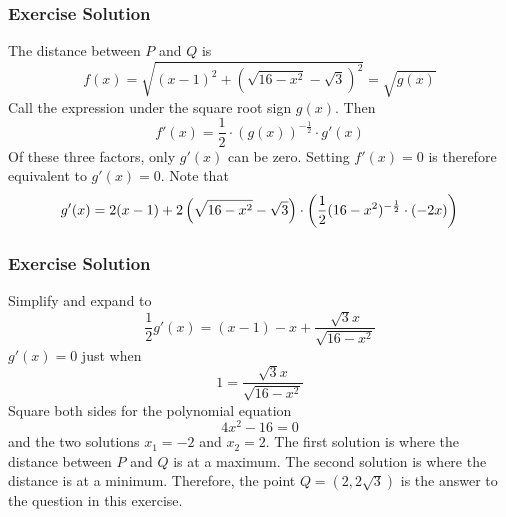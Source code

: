 \documentclass[xcolor=dvipsnames]{beamer}
\newcounter{exercise}
\begin{document}
\begin{frame}
  \frametitle{Exercise Solution}
  The distance between $P$ and $Q$ is
\begin{equation}
  \label{eq:ohghoote}
  f(x)=\sqrt{(x-1)^{2}+(\sqrt{16-x^{2}}-\sqrt{3})^{2}}=\sqrt{g(x)}
\end{equation}
Call the expression under the square root sign $g(x)$. Then
\begin{equation}
  \label{eq:ouwophai}
  f'(x)=\frac{1}{2}\cdot\left(g(x)\right)^{-\frac{1}{2}}\cdot{}g'(x)
\end{equation}
Of these three factors, only $g'(x)$ can be zero. Setting $f'(x)=0$ is
therefore equivalent to $g'(x)=0$. Note that
\begin{equation}
  \label{eq:poqueebo}
  g'(x)=2(x-1)+2\left(\sqrt{16-x^{2}}-\sqrt{3}\right)\cdot\left(\frac{1}{2}(16-x^{2})^{-\frac{1}{2}}\cdot(-2x)\right)\notag
\end{equation}
\end{frame}

\begin{frame}
  \frametitle{Exercise Solution}
Simplify and expand to
\begin{equation}
  \label{eq:deiquoot}
  \frac{1}{2}g'(x)=(x-1)-x+\frac{\sqrt{3}x}{\sqrt{16-x^{2}}}
\end{equation}
$g'(x)=0$ just when
\begin{equation}
  \label{eq:xoonahju}
  1=\frac{\sqrt{3}x}{\sqrt{16-x^{2}}}
\end{equation}
Square both sides for the polynomial equation
\begin{equation}
  \label{eq:uabaevoo}
4x^{2}-16=0
\end{equation}
and the two solutions $x_{1}=-2$ and $x_{2}=2$. The first solution is
where the distance between $P$ and $Q$ is at a maximum. The second
solution is where the distance is at a minimum. Therefore, the point
$Q=(2,2\sqrt{3})$ is the answer to the question in this exercise.
\end{frame}
\end{document}
